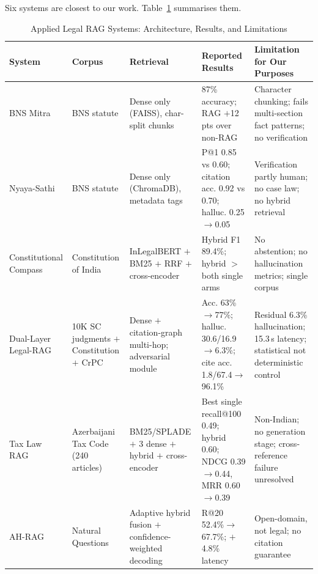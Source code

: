\documentclass[conference]{IEEEtran}
\begin{document}
Six systems are closest to our work. Table~\ref{tab:applied} summarises them.

\begin{table}[t]
\caption{Applied Legal RAG Systems: Architecture, Results, and Limitations}
\label{tab:applied}
\centering
\footnotesize
\begin{tabular}{@{}p{2.0cm}p{2.1cm}p{3.0cm}p{4.0cm}p{4.5cm}@{}}
\toprule
\textbf{System} & \textbf{Corpus} & \textbf{Retrieval} & \textbf{Reported Results} & \textbf{Limitation for Our Purposes} \\
\midrule
BNS Mitra \cite{patil2025} & BNS statute & Dense only (FAISS), char-split chunks & 87\% accuracy; RAG $+$12 pts over non-RAG & Character chunking; fails multi-section fact patterns; no verification \\
\addlinespace
Nyaya-Sathi \cite{dixit2025} & BNS statute & Dense only (ChromaDB), metadata tags & P@1 0.85 vs 0.60; citation acc. 0.92 vs 0.70; halluc. 0.25$\rightarrow$0.05 & Verification partly human; no case law; no hybrid retrieval \\
\addlinespace
Constitutional Compass \cite{bolla2026} & Constitution of India & InLegalBERT $+$ BM25 $+$ RRF $+$ cross-encoder & Hybrid F1 89.4\%; hybrid $>$ both single arms & No abstention; no hallucination metrics; single corpus \\
\addlinespace
Dual-Layer Legal-RAG \cite{bindra2026} & 10K SC judgments $+$ Constitution $+$ CrPC & Dense $+$ citation-graph multi-hop; adversarial module & Acc. 63\%$\rightarrow$77\%; halluc. 30.6/16.9$\rightarrow$6.3\%; cite acc. 1.8/67.4$\rightarrow$96.1\% & Residual 6.3\% hallucination; 15.3\,s latency; statistical not deterministic control \\
\addlinespace
Tax Law RAG \cite{rustamov2025} & Azerbaijani Tax Code (240 articles) & BM25/SPLADE $+$ 3 dense $+$ hybrid $+$ cross-encoder & Best single recall@100 0.49; hybrid 0.60; NDCG 0.39$\rightarrow$0.44, MRR 0.60$\rightarrow$0.39 & Non-Indian; no generation stage; cross-reference failure unresolved \\
\addlinespace
AH-RAG \cite{sun2025} & Natural Questions & Adaptive hybrid fusion $+$ confidence-weighted decoding & R@20 52.4\%$\rightarrow$67.7\%; $+$4.8\% latency & Open-domain, not legal; no citation guarantee \\
\bottomrule
\end{tabular}
\end{table}
\end{document}
